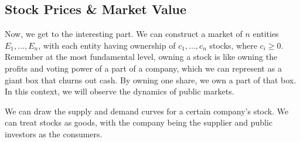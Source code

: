 \documentclass{article}
\begin{document}
  \subsection{Stock Prices \& Market Value}

    Now, we get to the interesting part. We can construct a market of $n$ entities $E_1, \ldots, E_n$, with each entity having ownership of $c_1, \ldots, c_n$ stocks, where $c_i \geq 0$. Remember at the most fundamental level, owning a stock is like owning the profits and voting power of a part of a company, which we can represent as a giant box that churns out cash. By owning one share, we own a part of that box. In this context, we will observe the dynamics of public markets. 

    We can draw the supply and demand curves for a certain company's stock. We can treat stocks as goods, with the company being the supplier and public investors as the consumers. 
\end{document}
